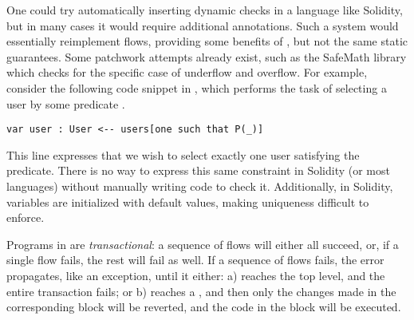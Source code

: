 \documentclass[nonacm, dvipsnames, sigconf]{acmart}
\begin{document}
One could try automatically inserting dynamic checks in a language like Solidity, but in many cases it would require additional annotations.
Such a system would essentially reimplement flows, providing some benefits of \langName, but not the same static guarantees.
Some patchwork attempts already exist, such as the SafeMath library which checks for the specific case of underflow and overflow.
For example, consider the following code snippet in \langName, which performs the task of selecting a user by some predicate .
\begin{lstlisting}[language=flow]
var user : User <-- users[one such that P(_)]
\end{lstlisting}
This line expresses that we wish to select exactly one user satisfying the predicate.
There is no way to express this same constraint in Solidity (or most languages) without manually writing code to check it.
Additionally, in Solidity, variables are initialized with default values, making uniqueness difficult to enforce.


Programs in \langName are \emph{transactional}: a sequence of flows will either all succeed, or, if a single flow fails, the rest will fail as well.
If a sequence of flows fails, the error propagates, like an exception, until it either: a) reaches the top level, and the entire transaction fails; or b) reaches a , and then only the changes made in the corresponding  block will be reverted, and the code in the  block will be executed.
\end{document}
